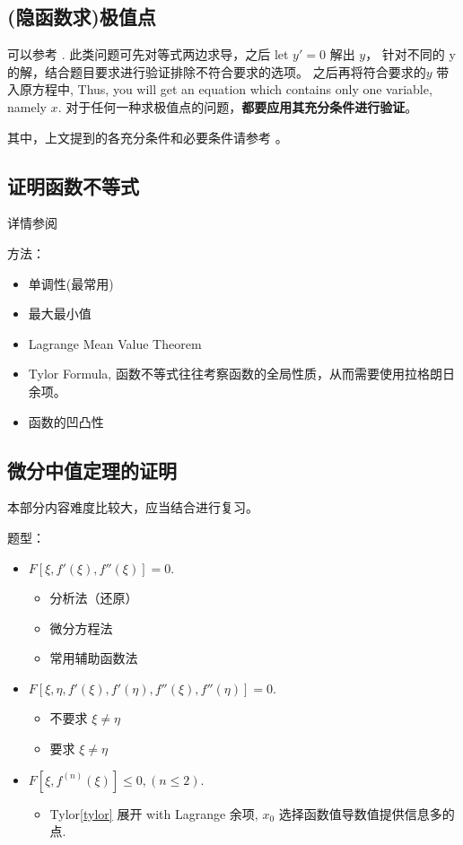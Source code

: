 \subsection{(隐函数求)极值点}

可以参考 \cite[page 71, pdf 82, 例2]{we}.
此类问题可先对等式两边求导，之后 let $y' = 0$ 解出 $y$，
针对不同的 y 的解，结合题目要求进行验证排除不符合要求的选项。
之后再将符合要求的$y$ 带入原方程中, Thus, you will get an
equation which contains only one variable, namely $x$.
对于任何一种求极值点的问题，\textbf{都要应用其充分条件进行验证}。

其中，上文提到的各充分条件和必要条件请参考
\cite[page 68, pdf 79]{we}。

\subsection{证明函数不等式}

详情参阅 \cite[page 79, pdf 90]{we}

方法：
\begin{itemize}
    \item 单调性(最常用)
    \item 最大最小值
    \item Lagrange Mean Value Theorem
    \item Tylor Formula, 函数不等式往往考察函数的全局性质，从而需要使用拉格朗日余项。
    \item 函数的凹凸性
\end{itemize}

\subsection{微分中值定理的证明}

本部分内容难度比较大，应当结合\cite{we}进行复习。

题型：
\begin{itemize}
    \item $F\left[\xi, f'(\xi), f''(\xi)\right] = 0$.
        \begin{itemize}
            \item 分析法（还原）
            \item 微分方程法
            \item 常用辅助函数法
        \end{itemize}
    \item $F\left[\xi, \eta, f'(\xi), f'(\eta), f''(\xi), f''(\eta)\right] = 0$.
        \begin{itemize}
            \item 不要求 $\xi \neq \eta$
            \item 要求 $\xi \neq \eta$
        \end{itemize}
    \item $F\left[\xi, f^{(n)}(\xi)\right] \leq 0, (n \leq 2)$.
        \begin{itemize}
            \item Tylor\ref{tylor} 展开 with Lagrange 余项, 
                  $x_0$ 选择函数值导数值提供信息多的点.
        \end{itemize}
\end{itemize}

